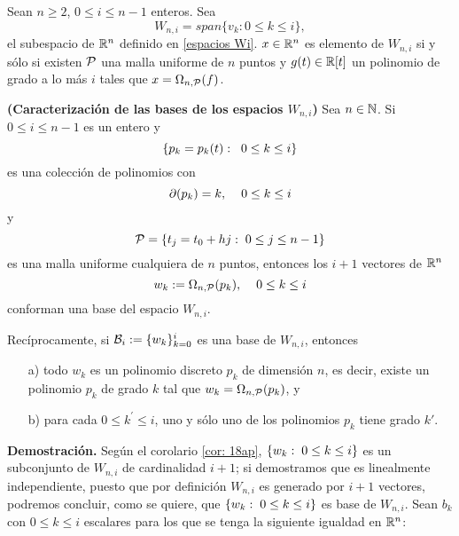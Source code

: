 
\begin{cor}
\label{cor: 18ap}
Sean $n\geq 2$, $0 \leq i \leq n-1$ enteros. 
Sea
\begin{equation*}
\label{def de espacios Wk}
W_{n,i}= span\{ v_{k} : 0 \leq k \leq i \},
\end{equation*}
el subespacio de $\mathbb{R}^{n}$ 
definido en \eqref{espacios Wi}.
$x \in \mathbb{R}^{n}$ es elemento de $W_{n,i}$ si y sólo si 
existen $\mathcal{P}$ una malla uniforme de $n$ puntos y
$g(t) \in \mathbb{R}[t]$ un polinomio de grado a lo más $i$
tales que 
$x = \Omega_{n, \mathcal{P}}(f)$.
\end{cor}


\begin{prop} \label{Teorema1}
\textbf{(Caracterización de las bases
de los espacios $W_{n,i}$)} Sea $n \in \mathbb{N}$.
Si $0 \leq i \leq n-1$ es un entero y
\[
\{ p_{k}=p_{k}(t): \hspace{0.2cm} 0 \leq k \leq i \}
\]
es una colección de polinomios con
\[
\partial (p_{k})=k, \hspace{0.4cm} 0 \leq k \leq i
\]
y 
\[
\mathcal{P}= \{ t_{j}= t_{0}+hj :\hspace{0.1cm} 0 \leq j \leq n-1 \}
\]
es una malla uniforme cualquiera
de $n$ puntos, entonces los $i+1$ vectores
de $\mathbb{R}^{n}$
\begin{equation}
\label{eq1: 30Oct}
w_{k} := \Omega_{n, \mathcal{P}}(p_{k}), \hspace{0.4cm} 0 \leq k \leq i
\end{equation}
conforman una base del espacio $W_{n,i}$.

Recíprocamente, si $\mathcal{B}_{i} := \{ w_{k} \}_{k=0}^{i}$
es una base de $W_{n,i}$, entonces 
\begin{itemize}
	\item[a)] todo $w_{k}$ es un polinomio discreto $p_{k}$ de dimensión $n$, 
	es decir, existe un polinomio $p_{k}$ de grado $k$ tal que 
	$w_{k} = \Omega_{n, \mathcal{P}}(p_{k})$,	
	y
	\item[b)] para cada $0 \leq k^{'} \leq i$, uno y sólo uno de los polinomios
	$p_{k}$ tiene grado $k'$.
\end{itemize}
\end{prop}
\noindent
\textbf{Demostración.}
Según el corolario \ref{cor: 18ap}, 
$\{ w_{k}: \hspace{0.1cm} 0 \leq k \leq i \}$
es un subconjunto de $W_{n,i}$ de cardinalidad $i+1$; 
si demostramos que es 
linealmente independiente, puesto que por definición
$W_{n,i}$ es generado por $i+1$ vectores, podremos concluir,
como se quiere, que $\{ w_{k}: \hspace{0.1cm} 0 \leq k \leq i \}$
es base de $W_{n,i}$.
Sean $b_{k}$ con $0 \leq k \leq i$ escalares
para los que se tenga la siguiente igualdad en $\mathbb{R}^{n}$:

